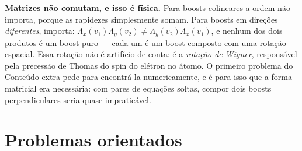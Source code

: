 \documentclass[12pt,a4paper,oneside]{book}
\theoremstyle{rgplain}
\theoremstyle{rgremark}
\begin{document}
\begin{atencao}
\textbf{Matrizes não comutam, e isso é física.} Para boosts colineares a ordem
não importa, porque as rapidezes simplesmente somam. Para boosts em direções
\emph{diferentes}, importa: $\Lambda_x(v_1)\Lambda_y(v_2)\ne\Lambda_y(v_2)\Lambda_x(v_1)$,
e nenhum dos dois produtos é um boost puro --- cada um é um boost composto com
uma rotação espacial. Essa rotação não é artifício de conta: é a
\emph{rotação de Wigner}, responsável pela precessão de Thomas do spin do
elétron no átomo. O primeiro problema do Conteúdo extra pede para encontrá-la
numericamente, e é para isso que a forma matricial era necessária: com pares de
equações soltas, compor dois boosts perpendiculares seria quase impraticável.
\end{atencao}

\section{Problemas orientados}
\end{document}

